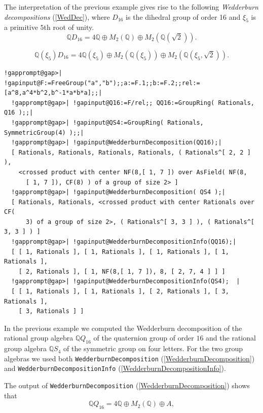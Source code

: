 \documentclass[a4paper,11pt]{report}
\begin{document}
{{ The interpretation of the previous example gives rise to the following \emph{Wedderburn decompositions} (\ref{WedDec}), where $D_{16}$ is the dihedral group of order 16 and $\xi_5$ is a primitive $5$\texttt{}th root of unity. 
\[ {\ensuremath{\mathbb Q}} D_{16} = 4 {\ensuremath{\mathbb Q}} \oplus M_2(
{\ensuremath{\mathbb Q}} ) \oplus M_2( {\ensuremath{\mathbb Q}} (\sqrt{2})). \]
 
\[ {\ensuremath{\mathbb Q}} (\xi_5) D_{16} = 4 {\ensuremath{\mathbb Q}} (\xi_5)
\oplus M_2( {\ensuremath{\mathbb Q}} (\xi_5)) \oplus M_2( {\ensuremath{\mathbb
Q}} (\xi_5,\sqrt{2})). \]
 
\begin{Verbatim}[commandchars=!@|,fontsize=\small,frame=single,label=Example]
  !gapprompt@gap>| !gapinput@F:=FreeGroup("a","b");;a:=F.1;;b:=F.2;;rel:=[a^8,a^4*b^2,b^-1*a*b*a];;|
  !gapprompt@gap>| !gapinput@Q16:=F/rel;; QQ16:=GroupRing( Rationals, Q16 );;|
  !gapprompt@gap>| !gapinput@QS4:=GroupRing( Rationals, SymmetricGroup(4) );;|
  !gapprompt@gap>| !gapinput@WedderburnDecomposition(QQ16);|
  [ Rationals, Rationals, Rationals, Rationals, ( Rationals^[ 2, 2 ] ),
    <crossed product with center NF(8,[ 1, 7 ]) over AsField( NF(8,
      [ 1, 7 ]), CF(8) ) of a group of size 2> ]
  !gapprompt@gap>| !gapinput@WedderburnDecomposition( QS4 );|
  [ Rationals, Rationals, <crossed product with center Rationals over CF(
      3) of a group of size 2>, ( Rationals^[ 3, 3 ] ), ( Rationals^[ 3, 3 ] ) ]
  !gapprompt@gap>| !gapinput@WedderburnDecompositionInfo(QQ16);|
  [ [ 1, Rationals ], [ 1, Rationals ], [ 1, Rationals ], [ 1, Rationals ], 
    [ 2, Rationals ], [ 1, NF(8,[ 1, 7 ]), 8, [ 2, 7, 4 ] ] ]
  !gapprompt@gap>| !gapinput@WedderburnDecompositionInfo(QS4);  |
  [ [ 1, Rationals ], [ 1, Rationals ], [ 2, Rationals ], [ 3, Rationals ], 
    [ 3, Rationals ] ]
\end{Verbatim}
 In the previous example we computed the Wedderburn decomposition of the
rational group algebra ${\ensuremath{\mathbb Q}} Q_{16}$ of the quaternion group of order $16$ and the rational group algebra ${\ensuremath{\mathbb Q}} S_{4}$ of the symmetric group on four letters. For the two group algebras we used
both \texttt{WedderburnDecomposition} (\ref{WedderburnDecomposition}) and \texttt{WedderburnDecompositionInfo} (\ref{WedderburnDecompositionInfo}). 

 The output of \texttt{WedderburnDecomposition} (\ref{WedderburnDecomposition}) shows that 
\[ {\ensuremath{\mathbb Q}} Q_{16} = 4 {\ensuremath{\mathbb Q}} \oplus M_2(
{\ensuremath{\mathbb Q}} ) \oplus A, \]
 
}}
\end{document}
